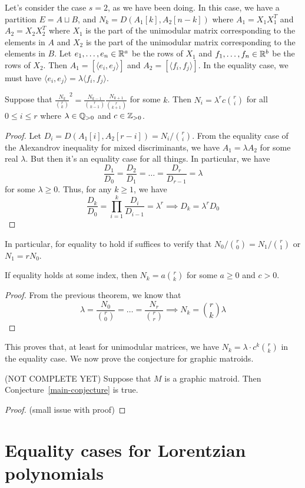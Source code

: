 \documentclass[12pt]{article}
\begin{document}
Let's consider the case $s = 2$, as we have been doing. In this case, we have a partition $E = A \sqcup B$, and $N_k = D(A_1[k], A_2[n-k])$ where $A_1 = X_1 X_1^T$ and $A_2 = X_2 X_2^T$ where $X_1$ is the part of the unimodular matrix corresponding to the elements in $A$ and $X_2$ is the part of the unimodular matrix corresponding to the elements in $B$. Let $e_1, \ldots, e_n \in \mathbb{R}^a$ be the rows of $X_1$ and $f_1, \ldots, f_n \in \mathbb{R}^b$ be the rows of $X_2$. Then $A_1 = [\langle e_i, e_j \rangle ]$ and $A_2 = [\langle f_i, f_j \rangle]$. In the equality case, we must have $\langle e_i, e_j \rangle = \lambda \langle f_i, f_j \rangle$. 

\begin{thm}
	Suppose that $\frac{N_k}{\binom{r}{k}}^2 = \frac{N_{k-1}}{\binom{r}{k-1}} \frac{N_{k+1}}{\binom{r}{k+1}}$ for some $k$. Then $N_i = \lambda^r c \binom{r}{i}$ for all $0 \leq i \leq r$ where $\lambda \in \mathbb{Q}_{> 0}$ and $c \in \mathbb{Z}_{> 0}$. 
\end{thm}

\begin{proof}
	Let $D_i = D(A_1[i], A_2 [r-i]) = N_i / \binom{r}{i}$. From the equality case of the Alexandrov inequality for mixed discriminants, we have $A_1 = \lambda A_2$ for some real $\lambda$. But then it's an equality case for all things. In particular, we have 
	\[
		\frac{D_1}{D_0} = \frac{D_2}{D_1} = \ldots = \frac{D_r}{D_{r-1}} = \lambda
	\]
	for some $\lambda \geq 0$. Thus, for any $k \geq 1$, we have 
	\[
		\frac{D_k}{D_0} = \prod_{i = 1}^k \frac{D_{i}}{D_{i-1}} = \lambda^r \implies D_k = \lambda^r D_0
	\]
\end{proof}

In particular, for equality to hold if suffices to verify that $N_0 / \binom{r}{0} = N_1 / \binom{r}{1}$ or $N_1 = r N_0$. 

\begin{thm}
	If equality holds at some index, then $N_k = a\binom{r}{k}$ for some $ a \geq 0$ and $c > 0$. 
\end{thm}

\begin{proof}
	From the previous theorem, we know that 
	\[
		\lambda = \frac{N_0}{\binom{r}{0}} = \ldots = \frac{N_r}{\binom{r}{r}} \implies N_k = \binom{r}{k} \lambda 
	\]
\end{proof}
This proves that, at least for unimodular matrices, we have $N_k = \lambda \cdot c^k \binom{r}{k}$ in the equality case. We now prove the conjecture for graphic matroids. 

\begin{thm}
	(NOT COMPLETE YET) Suppose that $M$ is a graphic matroid. Then Conjecture~\ref{main-conjecture} is true.
\end{thm}
\begin{proof}
	(small issue with proof) 
\end{proof}

\section{Equality cases for Lorentzian polynomials}



\end{document}
